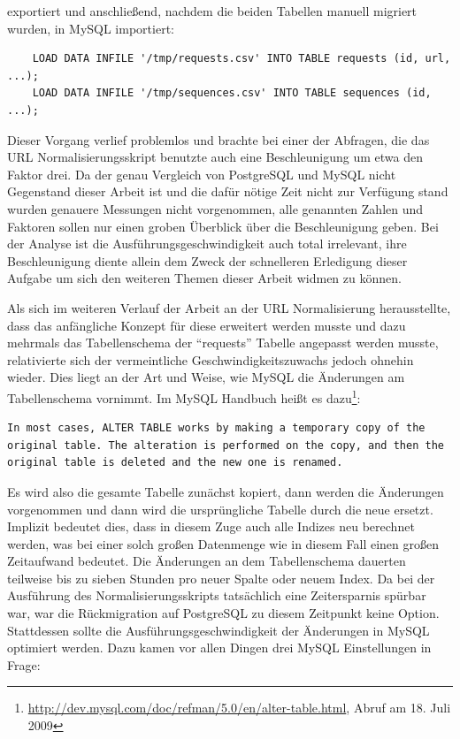 \documentclass[10pt]{scrartcl}
\begin{document}
exportiert und anschließend, nachdem die beiden Tabellen manuell migriert wurden, in MySQL importiert:

\begin{verbatim}
    LOAD DATA INFILE '/tmp/requests.csv' INTO TABLE requests (id, url, ...);
    LOAD DATA INFILE '/tmp/sequences.csv' INTO TABLE sequences (id, ...);
\end{verbatim}
  
Dieser Vorgang verlief problemlos und brachte bei einer der Abfragen, die das URL Normalisierungsskript benutzte auch eine Beschleunigung um etwa den Faktor drei. Da der genau Vergleich von PostgreSQL und MySQL nicht Gegenstand dieser Arbeit ist und die dafür nötige Zeit nicht zur Verfügung stand wurden genauere Messungen nicht vorgenommen, alle genannten Zahlen und Faktoren sollen nur einen groben Überblick über die Beschleunigung geben. Bei der Analyse ist die Ausführungsgeschwindigkeit auch total irrelevant, ihre Beschleunigung diente allein dem Zweck der schnelleren Erledigung dieser Aufgabe um sich den weiteren Themen dieser Arbeit widmen zu können. 

Als sich im weiteren Verlauf der Arbeit an der URL Normalisierung herausstellte, dass das anfängliche Konzept für diese erweitert werden musste und dazu mehrmals das Tabellenschema der ``requests'' Tabelle angepasst werden musste, relativierte sich der vermeintliche Geschwindigkeitszuwachs jedoch ohnehin wieder. Dies liegt an der Art und Weise, wie MySQL die Änderungen am Tabellenschema vornimmt. Im MySQL Handbuch heißt es dazu\footnote{\url{http://dev.mysql.com/doc/refman/5.0/en/alter-table.html}, Abruf am 18. Juli 2009}:

\begin{verbatim}
In most cases, ALTER TABLE works by making a temporary copy of the original table. The alteration is performed on the copy, and then the original table is deleted and the new one is renamed.
\end{verbatim}

Es wird also die gesamte Tabelle zunächst kopiert, dann werden die Änderungen vorgenommen und dann wird die ursprüngliche Tabelle durch die neue ersetzt. Implizit bedeutet dies, dass in diesem Zuge auch alle Indizes neu berechnet werden, was bei einer solch großen Datenmenge wie in diesem Fall einen großen Zeitaufwand bedeutet. Die Änderungen an dem Tabellenschema dauerten teilweise bis zu sieben Stunden pro neuer Spalte oder neuem Index. Da bei der Ausführung des Normalisierungsskripts tatsächlich eine Zeitersparnis spürbar war, war die Rückmigration auf PostgreSQL zu diesem Zeitpunkt keine Option. Stattdessen sollte die Ausführungsgeschwindigkeit der Änderungen in MySQL optimiert werden. Dazu kamen vor allen Dingen drei MySQL Einstellungen in Frage:
\end{document}
